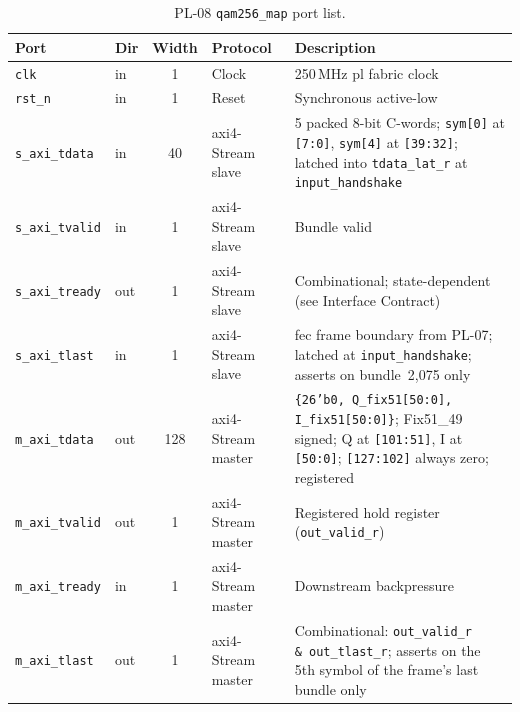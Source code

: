 \begin{table}[htbp]
  \caption{PL-08 \texttt{qam256\_map} port list.}
  \label{tab:pl08_ports}
  \centering
  \small
  \begin{tabular}{llcp{2.7cm}p{5.8cm}}
    \hline
    Port                    & Dir  & Width & Protocol               & Description \\
    \hline
    \texttt{clk}            & in   & 1     & Clock
      & 250\,MHz \ac{pl} fabric clock \\[2pt]
    \texttt{rst\_n}         & in   & 1     & Reset
      & Synchronous active-low \\[2pt]
    \texttt{s\_axi\_tdata}  & in   & 40    & \ac{axi}4-Stream slave
      & 5 packed 8-bit C-words; \texttt{sym[0]} at \texttt{[7:0]},
        \texttt{sym[4]} at \texttt{[39:32]};
        latched into \texttt{tdata\_lat\_r} at \texttt{input\_handshake} \\[2pt]
    \texttt{s\_axi\_tvalid} & in   & 1     & \ac{axi}4-Stream slave
      & Bundle valid \\[2pt]
    \texttt{s\_axi\_tready} & out  & 1     & \ac{axi}4-Stream slave
      & Combinational; state-dependent (see Interface Contract) \\[2pt]
    \texttt{s\_axi\_tlast}  & in   & 1     & \ac{axi}4-Stream slave
      & \ac{fec} frame boundary from PL-07; latched at
        \texttt{input\_handshake}; asserts on bundle~2{,}075 only \\[2pt]
    \texttt{m\_axi\_tdata}  & out  & 128   & \ac{axi}4-Stream master
      & \texttt{\{26'b0, Q\_fix51[50:0], I\_fix51[50:0]\}};
        Fix51\_49 signed; Q at \texttt{[101:51]}, I at \texttt{[50:0]};
        \texttt{[127:102]} always zero; registered \\[2pt]
    \texttt{m\_axi\_tvalid} & out  & 1     & \ac{axi}4-Stream master
      & Registered hold register (\texttt{out\_valid\_r}) \\[2pt]
    \texttt{m\_axi\_tready} & in   & 1     & \ac{axi}4-Stream master
      & Downstream backpressure \\[2pt]
    \texttt{m\_axi\_tlast}  & out  & 1     & \ac{axi}4-Stream master
      & Combinational: \texttt{out\_valid\_r \&\ out\_tlast\_r};
        asserts on the 5th symbol of the frame's last bundle only \\
    \hline
  \end{tabular}
\end{table}



